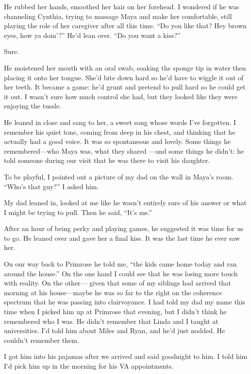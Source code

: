 \documentclass[12pt]{book}
\begin{document}
He rubbed her hands, smoothed her hair on her forehead. I wondered if he was channeling Cynthia, trying to massage Maya and make her comfortable, still playing the role of her caregiver after all this time. ``Do you like that? Hey brown eyes, how ya doin'?'' He'd lean over. ``Do you want a kiss?''

Sure.

He moistened her mouth with an oral swab, soaking the sponge tip in water then placing it onto her tongue. She'd bite down hard so he'd have to wiggle it out of her teeth. It became a game: he'd grunt and pretend to pull hard so he could get it out. I wasn't sure how much control she had, but they looked like they were enjoying the tussle.

He leaned in close and sang to her, a sweet song whose words I've forgotten. I remember his quiet tone, coming from deep in his chest, and thinking that he actually had a good voice. It was so spontaneous and lovely. Some things he remembered---who Maya was, what they shared ---and some things he didn't: he told someone during our visit that he was there to visit his daughter.

To be playful, I pointed out a picture of my dad on the wall in Maya's room. ``Who's that guy?'' I asked him.

My dad leaned in, looked at me like he wasn't entirely sure of his answer or what I might be trying to pull. Then he said, ``It's me.''

After an hour of being perky and playing games, he suggested it was time for us to go. He leaned over and gave her a final kiss. It was the last time he ever saw her.

On our way back to Primrose he told me, ``the kids came home today and ran around the house.'' On the one hand I could see that he was losing more touch with reality. On the other--- given that some of my siblings had arrived that morning at his house---maybe he was so far to the right on the coherence spectrum that he was passing into clairvoyance. I had told my dad my name this time when I picked him up at Primrose that evening, but I didn't think he remembered who I was. He didn't remember that Linda and I taught at universities. I'd told him about Miles and Ryan, and he'd just nodded. He couldn't remember them.

I got him into his pajamas after we arrived and said goodnight to him. I told him I'd pick him up in the morning for his VA appointments. 


\chapter{}
\end{document}
